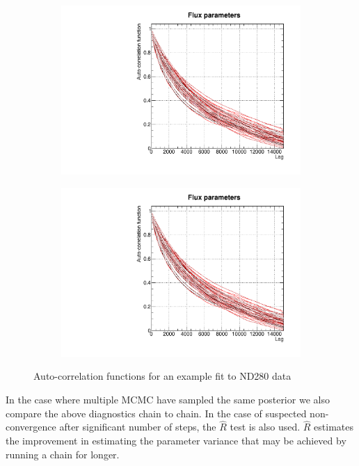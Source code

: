 \begin{figure}[h]
	\begin{subfigure}[t]{0.44\textwidth}
		\includegraphics[width=\textwidth, trim={0mm 0mm 0mm 0mm}, clip,page=1]{figures/mcmc/2018a_MultiPi_Binningv6_NewCov_Data_merge_MCMC_diag}
	\end{subfigure}
	\begin{subfigure}[t]{0.44\textwidth}
		\includegraphics[width=\textwidth, trim={0mm 0mm 0mm 0mm}, clip,page=2]{figures/mcmc/2018a_MultiPi_Binningv6_NewCov_Data_merge_MCMC_diag}
	\end{subfigure}
	\caption{Auto-correlation functions for an example fit to ND280 data}
	\label{fig:auto_corr}
\end{figure}

In the case where multiple MCMC have sampled the same posterior we also compare the above diagnostics chain to chain. In the case of suspected non-convergence after significant number of steps, the $\hat{R}$ test\cite{gelman_rubin} is also used. $\hat{R}$ estimates the improvement in estimating the parameter variance that may be achieved by running a chain for longer.


